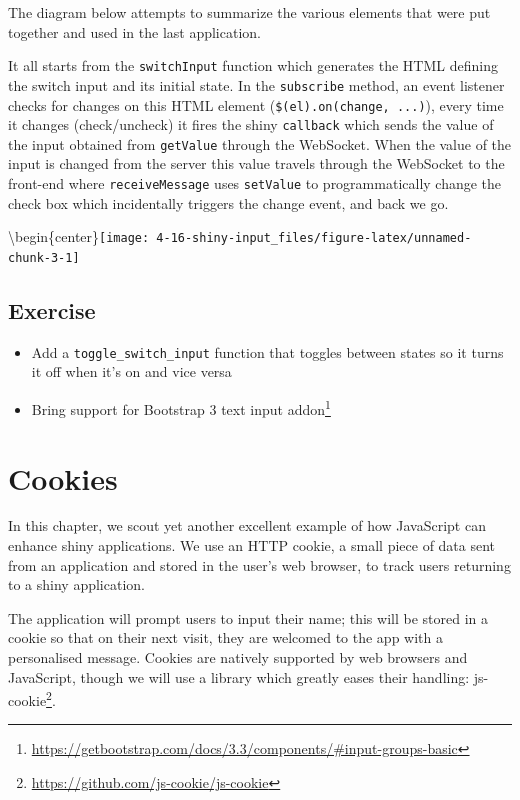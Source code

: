 \documentclass[
]{krantz}
\providecommand{\tightlist}{%
  \setlength{\itemsep}{0pt}\setlength{\parskip}{0pt}}
\renewcommand{\href}[2]{#2\footnote{\url{#1}}}
\begin{document}
The diagram below attempts to summarize the various elements that were put together and used in the last application.

It all starts from the \texttt{switchInput} function which generates the HTML defining the switch input and its initial state. In the \texttt{subscribe} method, an event listener checks for changes on this HTML element (\texttt{\$(el).on(\textquotesingle{}change\textquotesingle{},\ ...)}), every time it changes (check/uncheck) it fires the shiny \texttt{callback} which sends the value of the input obtained from \texttt{getValue} through the WebSocket. When the value of the input is changed from the server this value travels through the WebSocket to the front-end where \texttt{receiveMessage} uses \texttt{setValue} to programmatically change the check box which incidentally triggers the change event, and back we go.

\textbackslash begin\{center\}\texttt{[image: 4-16-shiny-input\_files/figure-latex/unnamed-chunk-3-1]}

\hypertarget{shiny-input-excercise}{%
\section{Exercise}\label{shiny-input-excercise}}

\begin{itemize}
\tightlist
\item
  Add a \texttt{toggle\_switch\_input} function that toggles between states so it turns it off when it's on and vice versa
\item
  Bring support for \href{https://getbootstrap.com/docs/3.3/components/\#input-groups-basic}{Bootstrap 3 text input addon}
\end{itemize}

\hypertarget{shiny-cookies}{%
\chapter{Cookies}\label{shiny-cookies}}

In this chapter, we scout yet another excellent example of how JavaScript can enhance shiny applications. We use an HTTP cookie, a small piece of data sent from an application and stored in the user's web browser, to track users returning to a shiny application.

The application will prompt users to input their name; this will be stored in a cookie so that on their next visit, they are welcomed to the app with a personalised message. Cookies are natively supported by web browsers and JavaScript, though we will use a library which greatly eases their handling: \href{https://github.com/js-cookie/js-cookie}{js-cookie}.
\end{document}
